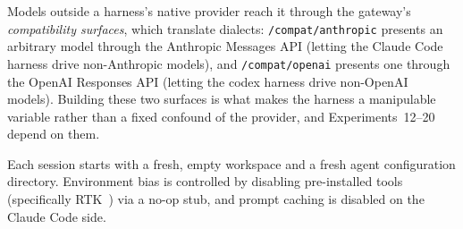 \documentclass{article}
\begin{document}
Models outside a harness's native provider reach it through the
gateway's \emph{compatibility surfaces}, which translate dialects:
\texttt{/compat/anthropic} presents an arbitrary model through the
Anthropic Messages API (letting the Claude Code harness drive
non-Anthropic models), and \texttt{/compat/openai} presents one
through the OpenAI Responses API (letting the codex harness drive
non-OpenAI models). Building these two surfaces is what makes the
harness a manipulable variable rather than a fixed confound of the
provider, and Experiments~12--20 depend on them.

Each session starts with a fresh, empty workspace and a fresh
agent configuration directory. Environment bias is controlled by
disabling pre-installed tools (specifically RTK~\citep{rtk2025})
via a no-op stub, and prompt caching is disabled on the Claude
Code side.
\end{document}
